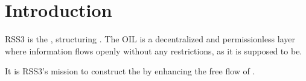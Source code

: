 \section{Introduction}

RSS3 is the , structuring .
The \gls{OIL} is a decentralized and permissionless layer where information flows openly without any restrictions, as it is supposed to be.

It is RSS3's mission to construct the  by enhancing the free flow of .

